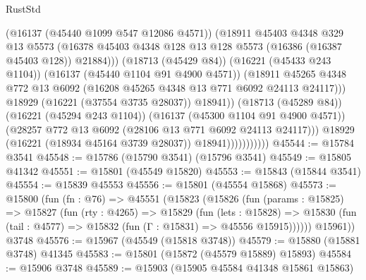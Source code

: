 \begin{lexlean}{RustStd}
\begin{coremodule}
                                    (@16137 (@45440 @1099 @547 @12086 @4571))
                                    (@18911
                                      @45403
                                      @4348
                                      @329
                                      @13
                                      @5573
                                      (@16378
                                        @45403
                                        @4348
                                        @128
                                        @13
                                        @128
                                        @5573
                                        (@16386 (@16387 @45403 @128))
                                        @21884)))
                                  (@18713 (@45429 @84))
                                  (@16221 (@45433 @243 @1104))
                                  (@16137 (@45440 @1104 @91 @4900 @4571))
                                  (@18911
                                    @45265
                                    @4348
                                    @772
                                    @13
                                    @6092
                                    (@16208 @45265 @4348 @13 @771 @6092 @24113 @24117)))
                                @18929
                                (@16221 (@37554 @3735 @28037))
                                @18941))
                            (@18713 (@45289 @84))
                            (@16221 (@45294 @243 @1104))
                            (@16137 (@45300 @1104 @91 @4900 @4571))
                            (@28257 @772 @13 @6092 (@28106 @13 @771 @6092 @24113 @24117)))
                          @18929
                          (@16221 (@18934 @45164 @3739 @28037))
                          @18941)))))))))))
@45544 := @15784 @3541
@45548 := @15786 (@15790 @3541) (@15796 @3541)
@45549 := @15805 @41342
@45551 := @15801 (@45549 @15820)
@45553 := @15843 (@15844 @3541)
@45554 := @15839 @45553
@45556 := @15801 (@45554 @15868)
@45573 := @15800
    (fun (fn : @76) =>
    @45551
      (@15823
        (@15826
          (fun (params : @15825) =>
          @15827
            (fun (rty : @4265) =>
            @15829
              (fun (lets : @15828) =>
              @15830 (fun (tail : @4577) => @15832 (fun (Γ : @15831) => @45556 @15915))))))
        @15961))
    @3748
@45576 := @15967 (@45549 (@15818 @3748))
@45579 := @15880 (@15881 @3748) @41345
@45583 := @15801 (@15872 (@45579 @15889) @15893)
@45584 := @15906 @3748
@45589 := @15903 (@15905 @45584 @41348 @15861 @15863)

\end{coremodule}
\end{lexlean}
